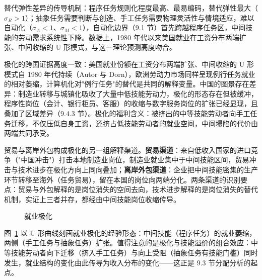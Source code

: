 替代弹性差异的传导机制：程序任务规则化程度最高、最易编码，替代弹性最大（$\sigma_R > 1$）；抽象任务需要判断与创造、手工任务需要物理灵活性与情境适应，难以自动化（$\sigma_A < 1$、$\sigma_M < 1$），自动化边界（9.1 节）首先跨越程序任务区，中间技能的劳动需求系统性下降。数据上，1980 年代以来美国就业在工资分布两端扩张、中间收缩的 U 形模式，与这一理论预测高度吻合。

极化的跨国证据高度一致：美国就业份额在工资分布两端扩张、中间收缩的 U 形模式自 1980 年代持续（Autor 与 Dorn），欧洲劳动力市场同样呈现例行任务就业的相对萎缩，计算机化对"例行任务"的替代是共同的解释变量。中国的图景存在差异：制造业转移与城镇化吸收了大量中低技能劳动力，极化的形态存在但被缓冲，程序性岗位（会计、银行柜员、客服）的收缩与数字服务岗位的扩张已经显现，且叠加了区域差异（9.4.3 节）。极化的福利含义：被挤出的中等技能劳动者向手工任务迁移，不仅压低自身工资，还挤占低技能劳动者的就业空间，中间塌陷的代价由两端共同承受。

贸易与离岸外包构成极化的另一组解释渠道。\textbf{贸易渠道}：来自低收入国家的进口竞争（"中国冲击"）打击本地制造业岗位，制造业就业集中于中间技能区间，贸易冲击与技术进步在极化方向上同向叠加；\textbf{离岸外包渠道}：企业把中间技能密集的生产环节转移至海外（任务贸易），留在本国的岗位向两端分化。两条渠道的识别要点：贸易与外包解释的是岗位消失的空间去向，技术进步解释的是岗位消失的替代机制，实证上三者并存，都经由中间技能岗位收缩传导。

\begin{figure}[htbp]
\centering
{}
\caption{就业极化}
\label{fig:polarization}
\end{figure}

图~\ref{fig:polarization} 以 U 形曲线刻画就业极化的经验形态：中间技能（程序任务）的就业萎缩，两侧（手工任务与抽象任务）扩张。值得注意的是极化与技能溢价的组合效应：中等技能劳动者向下迁移（挤入手工任务）与向上受阻（抽象任务有技能门槛）同时发生，就业结构的变化由此传导为收入分布的变化——这正是 9.3 节分配分析的起点。

